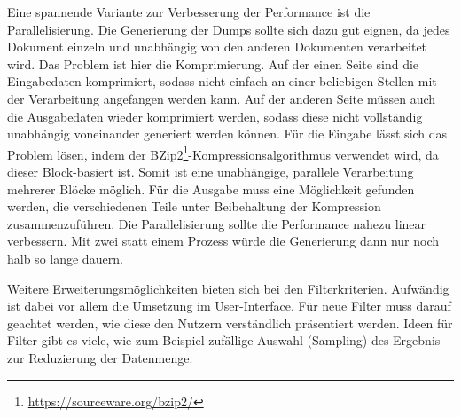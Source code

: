 Eine spannende Variante zur Verbesserung der Performance ist die Parallelisierung. 
Die Generierung der Dumps sollte sich dazu gut eignen, da jedes Dokument einzeln und unabhängig von den anderen Dokumenten verarbeitet wird.
Das Problem ist hier die Komprimierung.
Auf der einen Seite sind die Eingabedaten komprimiert, sodass nicht einfach an einer beliebigen Stellen mit der Verarbeitung angefangen werden kann.
Auf der anderen Seite müssen auch die Ausgabedaten wieder komprimiert werden, sodass diese nicht vollständig unabhängig voneinander generiert werden können.
Für die Eingabe lässt sich das Problem lösen, indem der BZip2\footnote{\url{https://sourceware.org/bzip2/}}-Kompressions\-algorithmus verwendet wird, da dieser Block-basiert ist.
Somit ist eine unabhängige, parallele Verarbeitung mehrerer Blöcke möglich.
Für die Ausgabe muss eine Möglichkeit gefunden werden, die verschiedenen Teile unter Beibehaltung der Kompression zusammenzuführen.
Die Parallelisierung sollte die Performance nahezu linear verbessern.
Mit zwei statt einem Prozess würde die Generierung dann nur noch halb so lange dauern.

Weitere Erweiterungsmöglichkeiten bieten sich bei den Filterkriterien. 
Aufwändig ist dabei vor allem die Umsetzung im User-Interface.
Für neue Filter muss darauf geachtet werden, wie diese den Nutzern verständlich präsentiert werden.
Ideen für Filter gibt es viele, wie zum Beispiel zufällige Auswahl (Sampling) des Ergebnis zur Reduzierung der Datenmenge.
